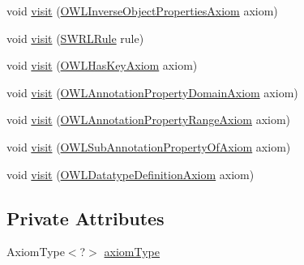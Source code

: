\begin{DoxyCompactItemize}
void \hyperlink{classorg_1_1semanticweb_1_1owlapi_1_1util_1_1_axiom_type_provider_ad63245a62aa77a00db23bb90a0b57935}{visit} (\hyperlink{interfaceorg_1_1semanticweb_1_1owlapi_1_1model_1_1_o_w_l_inverse_object_properties_axiom}{O\-W\-L\-Inverse\-Object\-Properties\-Axiom} axiom)
\item 
void \hyperlink{classorg_1_1semanticweb_1_1owlapi_1_1util_1_1_axiom_type_provider_af3251abd4de117b339fec080d498944a}{visit} (\hyperlink{interfaceorg_1_1semanticweb_1_1owlapi_1_1model_1_1_s_w_r_l_rule}{S\-W\-R\-L\-Rule} rule)
\item 
void \hyperlink{classorg_1_1semanticweb_1_1owlapi_1_1util_1_1_axiom_type_provider_a614fdec7f330adf80319f4363b308403}{visit} (\hyperlink{interfaceorg_1_1semanticweb_1_1owlapi_1_1model_1_1_o_w_l_has_key_axiom}{O\-W\-L\-Has\-Key\-Axiom} axiom)
\item 
void \hyperlink{classorg_1_1semanticweb_1_1owlapi_1_1util_1_1_axiom_type_provider_ad41b7f02c48244eea95a5cc0de5b7113}{visit} (\hyperlink{interfaceorg_1_1semanticweb_1_1owlapi_1_1model_1_1_o_w_l_annotation_property_domain_axiom}{O\-W\-L\-Annotation\-Property\-Domain\-Axiom} axiom)
\item 
void \hyperlink{classorg_1_1semanticweb_1_1owlapi_1_1util_1_1_axiom_type_provider_a80d2df32985ead373c998760614114de}{visit} (\hyperlink{interfaceorg_1_1semanticweb_1_1owlapi_1_1model_1_1_o_w_l_annotation_property_range_axiom}{O\-W\-L\-Annotation\-Property\-Range\-Axiom} axiom)
\item 
void \hyperlink{classorg_1_1semanticweb_1_1owlapi_1_1util_1_1_axiom_type_provider_a8057e5bed98d117f487b2d4568bf782e}{visit} (\hyperlink{interfaceorg_1_1semanticweb_1_1owlapi_1_1model_1_1_o_w_l_sub_annotation_property_of_axiom}{O\-W\-L\-Sub\-Annotation\-Property\-Of\-Axiom} axiom)
\item 
void \hyperlink{classorg_1_1semanticweb_1_1owlapi_1_1util_1_1_axiom_type_provider_a6d74088f09c2e512ed81f914553b4821}{visit} (\hyperlink{interfaceorg_1_1semanticweb_1_1owlapi_1_1model_1_1_o_w_l_datatype_definition_axiom}{O\-W\-L\-Datatype\-Definition\-Axiom} axiom)
\end{DoxyCompactItemize}
\subsection*{Private Attributes}
\begin{DoxyCompactItemize}
\item 
Axiom\-Type$<$?$>$ \hyperlink{classorg_1_1semanticweb_1_1owlapi_1_1util_1_1_axiom_type_provider_a4de9edccbd36e22c45d8540a2a42fd18}{axiom\-Type}
\end{DoxyCompactItemize}


